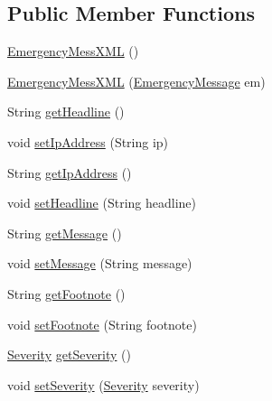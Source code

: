 \subsection*{Public Member Functions}
\begin{DoxyCompactItemize}
\item 
\hyperlink{classgov_1_1fnal_1_1ppd_1_1dd_1_1xml_1_1messages_1_1EmergencyMessXML_a963b9826be7c03bba14560690c93244a}{Emergency\-Mess\-X\-M\-L} ()
\item 
\hyperlink{classgov_1_1fnal_1_1ppd_1_1dd_1_1xml_1_1messages_1_1EmergencyMessXML_a0e973d15ae1519cd7a4f9e6a858b8da5}{Emergency\-Mess\-X\-M\-L} (\hyperlink{classgov_1_1fnal_1_1ppd_1_1dd_1_1emergency_1_1EmergencyMessage}{Emergency\-Message} em)
\item 
String \hyperlink{classgov_1_1fnal_1_1ppd_1_1dd_1_1xml_1_1messages_1_1EmergencyMessXML_a81e911981a92582d49e540e721b589a6}{get\-Headline} ()
\item 
void \hyperlink{classgov_1_1fnal_1_1ppd_1_1dd_1_1xml_1_1messages_1_1EmergencyMessXML_a76ce0f2fdf4b42995124c48a9d349063}{set\-Ip\-Address} (String ip)
\item 
String \hyperlink{classgov_1_1fnal_1_1ppd_1_1dd_1_1xml_1_1messages_1_1EmergencyMessXML_ab227d15c4f55af8c4cb275b38052e1df}{get\-Ip\-Address} ()
\item 
void \hyperlink{classgov_1_1fnal_1_1ppd_1_1dd_1_1xml_1_1messages_1_1EmergencyMessXML_a517ddd206a614ce1596d00127edb9dd4}{set\-Headline} (String headline)
\item 
String \hyperlink{classgov_1_1fnal_1_1ppd_1_1dd_1_1xml_1_1messages_1_1EmergencyMessXML_a46acaf949ecf0c6786089013328f9bc1}{get\-Message} ()
\item 
void \hyperlink{classgov_1_1fnal_1_1ppd_1_1dd_1_1xml_1_1messages_1_1EmergencyMessXML_a5b2125569d1b6fd71ed06c50044d796b}{set\-Message} (String message)
\item 
String \hyperlink{classgov_1_1fnal_1_1ppd_1_1dd_1_1xml_1_1messages_1_1EmergencyMessXML_afb16b32b48db4348fb91131572421545}{get\-Footnote} ()
\item 
void \hyperlink{classgov_1_1fnal_1_1ppd_1_1dd_1_1xml_1_1messages_1_1EmergencyMessXML_ac744b2fc50cffd90c7de36b465bcb4d0}{set\-Footnote} (String footnote)
\item 
\hyperlink{enumgov_1_1fnal_1_1ppd_1_1dd_1_1emergency_1_1Severity}{Severity} \hyperlink{classgov_1_1fnal_1_1ppd_1_1dd_1_1xml_1_1messages_1_1EmergencyMessXML_a8acef72d19d2eddf96b0afe6d0ca459e}{get\-Severity} ()
\item 
void \hyperlink{classgov_1_1fnal_1_1ppd_1_1dd_1_1xml_1_1messages_1_1EmergencyMessXML_a027b03e524d5c09508051afa8cb2112f}{set\-Severity} (\hyperlink{enumgov_1_1fnal_1_1ppd_1_1dd_1_1emergency_1_1Severity}{Severity} severity)

\end{DoxyCompactItemize}
